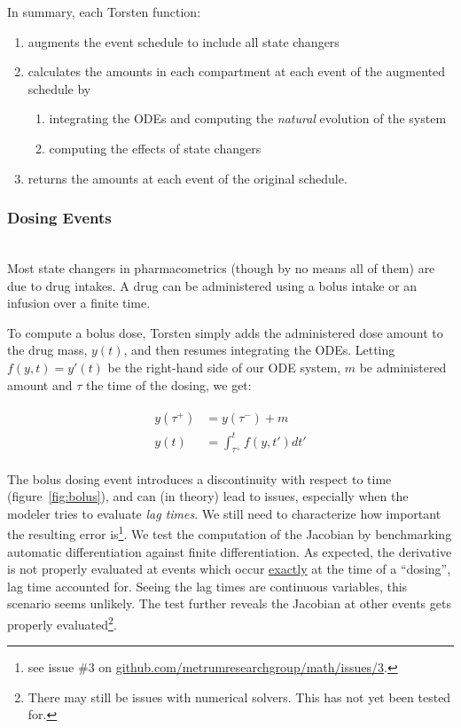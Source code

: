 \documentclass[11pt]{amsart}
\begin{document}
In summary, each Torsten function:
\begin{enumerate}
  \item augments the event schedule to include all state changers
  \item calculates the amounts in each compartment at each event of the augmented schedule by
  \begin{enumerate}
    \item integrating the ODEs and computing the \textit{natural} evolution of the system
    \item computing the effects of state changers
  \end{enumerate}
  \item returns the amounts at each event of the original schedule.
\end{enumerate}

\subsubsection{Dosing Events} \ \\

Most state changers in pharmacometrics (though by no means all of them) are due to drug
intakes. A drug can be administered using a bolus intake or an infusion over a finite time.

To compute a bolus dose, Torsten simply adds the administered dose amount to the drug 
mass, $y(t)$, and then resumes integrating the ODEs. Letting $f(y, t) = y'(t)$ be the right-hand 
side of our ODE system, $m$ be administered amount and $\tau$ the time of the dosing, we get:

\begin{eqnarray}
  \begin{aligned}
  y(\tau ^ +) &= y(\tau^-) + m \\
  y(t) &= \int_{\tau ^ +} ^ t f(y, t') dt'
  \end{aligned}
\end{eqnarray}


The bolus dosing event introduces a discontinuity with respect to time (figure~\ref{fig:bolus}), 
and can (in theory) lead to issues, especially when the modeler tries to evaluate \textit{lag times}. 
We still need to characterize how important the resulting error is\footnote{see issue \#3 on 
\url{github.com/metrumresearchgroup/math/issues/3}.}. We test the computation of the Jacobian
by benchmarking automatic differentiation against finite differentiation.  As expected, the 
derivative is not properly evaluated at events which occur \underline{exactly} at the time 
of a ``dosing'', lag time accounted for. Seeing the lag times are continuous variables, this 
scenario seems unlikely. The test further reveals the Jacobian at other events gets properly 
evaluated\footnote{There may still be issues with numerical solvers. This has not yet been tested for.}.
\end{document}
